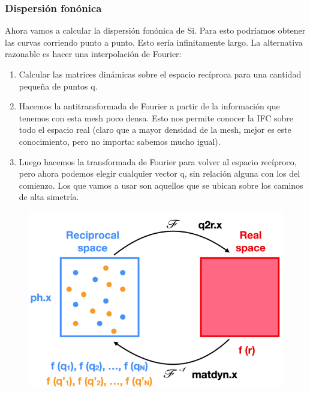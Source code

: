 \subsubsection{Dispersión fonónica}

  Ahora vamos a calcular la dispersión fonónica de Si. Para esto podríamos obtener las curvas corriendo punto a punto. Esto sería infinitamente largo. La alternativa razonable es hacer una interpolación de Fourier:
    \begin{enumerate}
      \item Calcular las matrices dinámicas sobre el espacio recíproca para una cantidad pequeña de puntos q.
      \item Hacemos la antitransformada de Fourier a partir de la información que tenemos con esta mesh poco densa. Esto nos permite conocer la IFC sobre todo el espacio real (claro que a mayor densidad de la mesh, mejor es este conocimiento, pero no importa: sabemos mucho igual).
      \item Luego hacemos la transformada de Fourier para volver al espacio recíproco, pero ahora podemos elegir cualquier vector q, sin relación alguna con los del comienzo. Los que vamos a usar son aquellos que se ubican  sobre los caminos de alta simetría.
    \end{enumerate}

    \begin{figure}[H]
      \centering
      \includegraphics[scale = 0.6]{figs/D5/Fourier.png}
    \end{figure}


